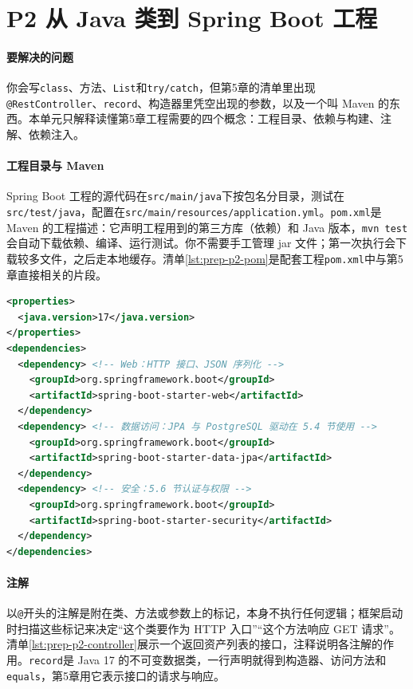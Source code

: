 \section{P2 从 Java 类到 Spring Boot 工程}
\label{app:prep-p2}

\paragraph{要解决的问题}你会写\texttt{class}、方法、\texttt{List}和\texttt{try/catch}，但第5章的清单里出现\texttt{@RestController}、\texttt{record}、构造器里凭空出现的参数，以及一个叫 Maven 的东西。本单元只解释读懂第5章工程需要的四个概念：工程目录、依赖与构建、注解、依赖注入。

\paragraph{工程目录与 Maven}Spring Boot 工程的源代码在\texttt{src/main/java}下按包名分目录，测试在\texttt{src/test/java}，配置在\texttt{src/main/resources/application.yml}。\texttt{pom.xml}是 Maven 的工程描述：它声明工程用到的第三方库（依赖）和 Java 版本，\texttt{mvn test}会自动下载依赖、编译、运行测试。你不需要手工管理 jar 文件；第一次执行会下载较多文件，之后走本地缓存。清单\ref{lst:prep-p2-pom}是配套工程\texttt{pom.xml}中与第5章直接相关的片段。

\begin{lstlisting}[label={lst:prep-p2-pom},language=XML,caption={pom.xml 片段：Java 版本与第5章用到的起步依赖}]
<properties>
  <java.version>17</java.version>
</properties>
<dependencies>
  <dependency> <!-- Web：HTTP 接口、JSON 序列化 -->
    <groupId>org.springframework.boot</groupId>
    <artifactId>spring-boot-starter-web</artifactId>
  </dependency>
  <dependency> <!-- 数据访问：JPA 与 PostgreSQL 驱动在 5.4 节使用 -->
    <groupId>org.springframework.boot</groupId>
    <artifactId>spring-boot-starter-data-jpa</artifactId>
  </dependency>
  <dependency> <!-- 安全：5.6 节认证与权限 -->
    <groupId>org.springframework.boot</groupId>
    <artifactId>spring-boot-starter-security</artifactId>
  </dependency>
</dependencies>
\end{lstlisting}

\paragraph{注解}以\texttt{@}开头的注解是附在类、方法或参数上的标记，本身不执行任何逻辑；框架启动时扫描这些标记来决定“这个类要作为 HTTP 入口”“这个方法响应 GET 请求”。清单\ref{lst:prep-p2-controller}展示一个返回资产列表的接口，注释说明各注解的作用。\texttt{record}是 Java 17 的不可变数据类，一行声明就得到构造器、访问方法和\texttt{equals}，第5章用它表示接口的请求与响应。

